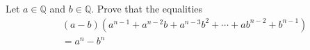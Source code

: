 \documentclass[paper=a4, fontsize=12pt]{scrartcl} %
\newcommand{\QQ}{\mathbb{Q}} %
\newcommand{\tup}[1]{\left( #1 \right)}
\theoremstyle{plainsl}
\theoremstyle{definition}
\theoremstyle{remark}
\begin{document}
Let $a \in \QQ$ and $b \in \QQ$.
Prove that the equalities
\begin{align}
& \tup{a-b} \tup{ a^{n-1} + a^{n-2} b + a^{n-3} b^2 + \cdots + a b^{n-2} + b^{n-1} }
\nonumber \\
& = a^n - b^n
\label{eq.exe.geo-series.1}
\end{align}
\end{document}
